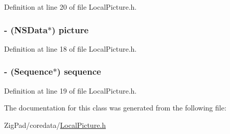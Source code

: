 Definition at line 20 of file LocalPicture.h.

\hypertarget{interface_local_picture_a757efbf7fad3c9e42f975cbaa4d8a7a5}{
\subsubsection[{picture}]{\setlength{\rightskip}{0pt plus 5cm}-\/ (NSData$\ast$) picture}}
\label{interface_local_picture_a757efbf7fad3c9e42f975cbaa4d8a7a5}


Definition at line 18 of file LocalPicture.h.

\hypertarget{interface_local_picture_a17f2837cead21bb5f65fb4cda2845b21}{
\subsubsection[{sequence}]{\setlength{\rightskip}{0pt plus 5cm}-\/ ({\bf Sequence}$\ast$) sequence}}
\label{interface_local_picture_a17f2837cead21bb5f65fb4cda2845b21}


Definition at line 19 of file LocalPicture.h.



The documentation for this class was generated from the following file:\begin{DoxyCompactItemize}
\item 
ZigPad/coredata/\hyperlink{_local_picture_8h}{LocalPicture.h}\end{DoxyCompactItemize}
